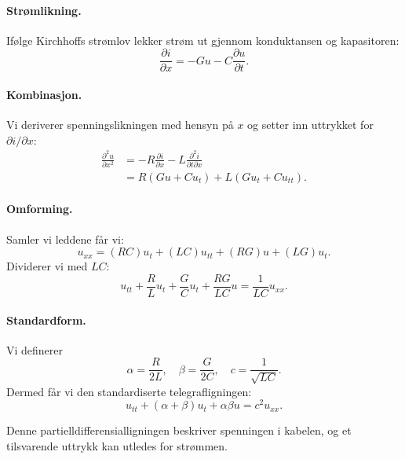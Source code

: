 \paragraph{Strømlikning.}  
Ifølge Kirchhoffs strømlov lekker strøm ut gjennom konduktansen og kapasitoren:
\begin{equation}
\frac{\partial i}{\partial x} = -G u - C \frac{\partial u}{\partial t}.
\end{equation}

\paragraph{Kombinasjon.}  
Vi deriverer spenningslikningen med hensyn på $x$ og setter inn uttrykket for $\partial i/\partial x$:
\begin{align}
\frac{\partial^2 u}{\partial x^2} 
&= -R \frac{\partial i}{\partial x} - L \frac{\partial^2 i}{\partial t \partial x} \\
&= R(G u + C u_t) + L(G u_t + C u_{tt}).
\end{align}

\paragraph{Omforming.}  
Samler vi leddene får vi:
\begin{equation}
u_{xx} = (RC) u_t + (LC) u_{tt} + (RG) u + (LG) u_t.
\end{equation}
Dividerer vi med $LC$:
\begin{equation}
u_{tt} + \frac{R}{L} u_t + \frac{G}{C} u_t + \frac{RG}{LC} u = \frac{1}{LC} u_{xx}.
\end{equation}

\paragraph{Standardform.}  
Vi definerer
\begin{equation}
\alpha = \frac{R}{2L}, \quad 
\beta = \frac{G}{2C}, \quad 
c = \frac{1}{\sqrt{LC}}.
\end{equation}
Dermed får vi den standardiserte telegrafligningen:
\begin{equation}
u_{tt} + (\alpha + \beta) u_t + \alpha \beta u = c^2 u_{xx}.
\end{equation}

Denne partielldifferensialligningen beskriver spenningen i kabelen, og et tilsvarende uttrykk kan utledes for strømmen.

